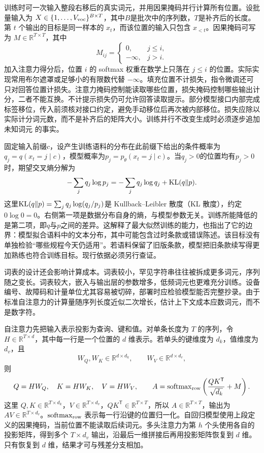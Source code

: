 训练时可一次输入整段右移后的真实词元，并用因果掩码并行计算所有位置。设批量输入为 $X\in\{1,\ldots,V_{\rm voc}\}^{B\times T}$，其中$B$是批次中的序列数，$T$是补齐后的长度。第 $t$ 个输出的目标是同一样本的 $x_t$，而该位置的输入只包含 $x_{<t}$。因果掩码可写为 $M\in\mathbb{R}^{T\times T}$，其中
\[
 M_{ij}=\begin{cases}0,&j\leq i,\\-\infty,&j>i.\end{cases}
\]
加入注意力得分后，位置 $i$ 的 softmax 权重在数学上只落在 $j\leq i$ 的位置。实际实现常用布尔遮罩或足够小的有限数代替 $-\infty$。填充位置不计损失，指令微调还可只对回答位置计损失。注意力掩码控制能读取哪些位置，损失掩码控制哪些输出计分，二者不能互换。不计提示损失仍可允许回答读取提示。部分模型接口内部完成标签移位，传入前须核对接口约定，避免手动移位后再次被内部移位。损失应除以实际计分词元数，而不是补齐后的矩阵大小。训练并行不改变生成时必须逐步追加未知词元 的事实。

固定输入前缀$c$，设产生训练语料的分布在此前缀下给出的条件概率为$q_j=q(x_t=j\mid c)$，模型概率为$p_j=p_\theta(x_t=j\mid c)$。当$q_j>0$的位置均有$p_j>0$时，期望交叉熵分解为
\begin{equation}
 -\sum_jq_j\log p_j=-\sum_jq_j\log q_j+\operatorname{KL}(q\|p).
\end{equation}
这里$\operatorname{KL}(q\|p)=\sum_jq_j\log(q_j/p_j)$是 Kullback--Leibler 散度（KL 散度），约定$0\log0=0$。右侧第一项是数据分布自身的熵，与模型参数无关。训练所能降低的是第二项，即$q$与$p$之间的差异。这解释了最大似然训练的能力，也指出了它的边界：模型拟合语料中的文本分布，其中可能包含过时条款或错误陈述。该目标没有单独检验“哪些规程今天仍适用”。若语料保留了旧版条款，模型把旧条款续写得更加熟练也符合训练目标。现行依据必须另行查证。

词表的设计还会影响计算成本。词表较小，罕见字符串往往被拆成更多词元，序列随之变长。词表较大，嵌入与输出层的参数增多，低频词元也更难充分训练。设备编号、故障码和计量单位尤其容易被切碎，部署时应检验模型能否完整抄录。由于标准自注意力的计算量随序列长度近似二次增长，估计上下文成本应数词元，而不是数字符。

自注意力先把输入表示投影为查询、键和值。对单条长度为 $T$ 的序列，令 $H\in\mathbb{R}^{T\times d}$，其中每一行是一个位置的 $d$ 维表示。若单头的键维度为 $d_k$，值维度为 $d_v$，且
\[
 W_Q,W_K\in\mathbb{R}^{d\times d_k},\qquad W_V\in\mathbb{R}^{d\times d_v},
\]
则
\begin{equation}
 Q=HW_Q,\quad K=HW_K,\quad V=HW_V,\qquad A=\operatorname{softmax}_{\rm row}\left(\frac{QK^{\mathsf T}}{\sqrt{d_k}}+M\right).
\end{equation}
这里 $Q,K\in\mathbb{R}^{T\times d_k}$，$V\in\mathbb{R}^{T\times d_v}$，$QK^{\mathsf T}\in\mathbb{R}^{T\times T}$，所以 $A\in\mathbb{R}^{T\times T}$，输出为 $AV\in\mathbb{R}^{T\times d_v}$。$\operatorname{softmax}_{\rm row}$ 表示每一行沿键的位置归一化。自回归模型使用上段定义的因果掩码，当前位置不能读取后续词元。多头注意力为第 $h$ 个头使用各自的投影矩阵，得到多个 $T\times d_v$ 输出，沿最后一维拼接后再用投影矩阵恢复到 $d$ 维。只有恢复到 $d$ 维，结果才可与残差分支相加。

